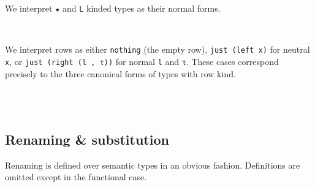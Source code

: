 \documentclass[authoryear, acmsmall, screen, review, nonacm]{acmart}
\begin{document}
\Ni We interpret \verb!★! and \verb!L! kinded types as their normal forms.

\begin{code}%
\>[0]\AgdaSpace{}%
\AgdaSpace{}%
\AgdaSpace{}%
\AgdaSymbol{=}\AgdaSpace{}%
\AgdaSpace{}%
\AgdaSpace{}%
\<%
\\
\>[0]\AgdaSpace{}%
\AgdaSpace{}%
\AgdaSpace{}%
\AgdaSymbol{=}\AgdaSpace{}%
\AgdaSpace{}%
\AgdaSpace{}%
\<%
\end{code}

\Ni We interpret rows as either \verb!nothing! (the empty row), \verb!just (left x)! for neutral \verb!x!, or \verb!just (right (l , τ))! for normal \verb!l! and \verb!τ!. These cases correspond precisely to the three canonical forms of types with row kind.

\begin{code}%
\>[0]\AgdaSpace{}%
\AgdaSpace{}%
\AgdaOperator{\AgdaInductiveConstructor{R[}}\AgdaSpace{}%
\AgdaSpace{}%
\AgdaOperator{\AgdaInductiveConstructor{]}}\AgdaSpace{}%
\AgdaSymbol{=}\AgdaSpace{}%
\<%
\\
\>[0][@{}l@{\AgdaIndent{0}}]%
\>[2]\AgdaSymbol{((}\AgdaSpace{}%
\AgdaSpace{}%
\AgdaOperator{\AgdaInductiveConstructor{R[}}\AgdaSpace{}%
\AgdaSpace{}%
\AgdaOperator{\AgdaInductiveConstructor{]}}\AgdaSymbol{)}\AgdaSpace{}%
\<%
\\
%
\>[2]\AgdaSymbol{(}\AgdaSpace{}%
\AgdaSpace{}%
\AgdaSpace{}%
\AgdaSpace{}%
\AgdaSpace{}%
\AgdaSpace{}%
\AgdaSymbol{))}\<%
\end{code}

\subsection{Renaming \& substitution}
Renaming is defined over semantic types in an obvious fashion. Definitions are omitted except in the functional case.
\end{document}
